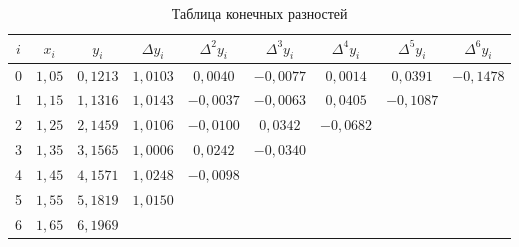 \documentclass[12pt,a4paper]{article}
\begin{document}
\begin{table}[H]
    \centering
    \footnotesize
    \setlength{\tabcolsep}{4pt}
    \caption{Таблица конечных разностей}
    \begin{tabular}{ccccccccc}
        \toprule
        $i$ & $x_i$ & $y_i$ & $\Delta y_i$ & $\Delta^2y_i$ & $\Delta^3y_i$ & $\Delta^4y_i$ & $\Delta^5y_i$ & $\Delta^6y_i$\\
        \midrule
        0 & $1{,}05$ & $0{,}1213$ & $1{,}0103$ & $0{,}0040$ & $-0{,}0077$ & $0{,}0014$ & $0{,}0391$ & $-0{,}1478$\\
        1 & $1{,}15$ & $1{,}1316$ & $1{,}0143$ & $-0{,}0037$ & $-0{,}0063$ & $0{,}0405$ & $-0{,}1087$ & \\
        2 & $1{,}25$ & $2{,}1459$ & $1{,}0106$ & $-0{,}0100$ & $0{,}0342$ & $-0{,}0682$ & & \\
        3 & $1{,}35$ & $3{,}1565$ & $1{,}0006$ & $0{,}0242$ & $-0{,}0340$ & & & \\
        4 & $1{,}45$ & $4{,}1571$ & $1{,}0248$ & $-0{,}0098$ & & & & \\
        5 & $1{,}55$ & $5{,}1819$ & $1{,}0150$ & & & & & \\
        6 & $1{,}65$ & $6{,}1969$ & & & & & & \\
        \bottomrule
    \end{tabular}
\end{table}
\end{document}
